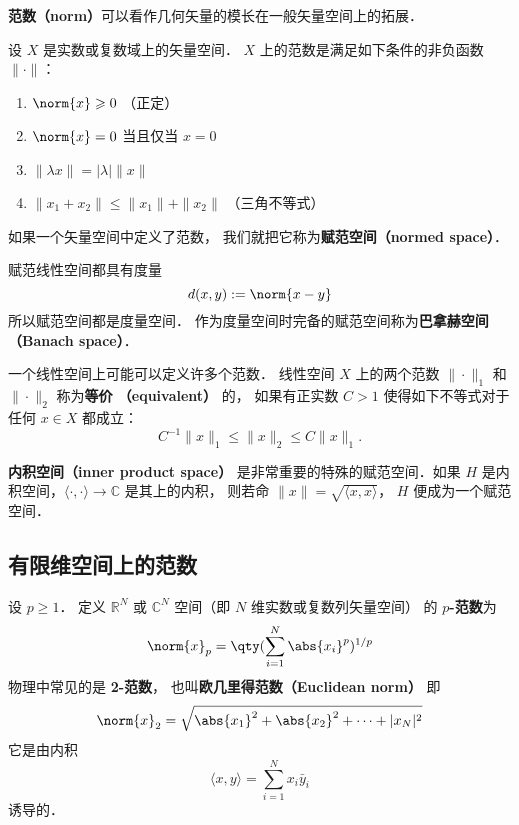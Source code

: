 
\begin{issues}
\end{issues}



\textbf{范数（norm）}可以看作几何矢量的模长在一般矢量空间上的拓展．
\begin{definition}{}\label{NormV_def1}
设 $X$ 是实数或复数域上的矢量空间． $X$ 上的范数是满足如下条件的非负函数 $\|\cdot\|$：
\begin{enumerate}
\item $\norm{x} \geqslant 0$ （正定）
\item $\norm{x} = 0$ 当且仅当 $x = 0$
\item $\|\lambda x\| = |\lambda|\|x\|$
\item $\|x_1+x_2\| \leqslant \|x_1\|+ \|x_2\|$ （三角不等式）
\end{enumerate}
如果一个矢量空间中定义了范数， 我们就把它称为\textbf{赋范空间（normed space）}．
\end{definition}

赋范线性空间都具有度量
\begin{equation}
d(x,y) := \norm{x-y}
\end{equation}
所以赋范空间都是度量空间． 作为度量空间时完备的赋范空间称为\textbf{巴拿赫空间（Banach space）}．

一个线性空间上可能可以定义许多个范数． 线性空间 $X$ 上的两个范数 $\|\cdot\|_1$ 和 $\|\cdot\|_2$ 称为\textbf{等价 （equivalent）} 的， 如果有正实数 $C>1$ 使得如下不等式对于任何 $x\in X$ 都成立：
$$
C^{-1}\|x\|_{1}\leq\|x\|_2\leq C\|x\|_1.
$$

\textbf{内积空间（inner product space）} 是非常重要的特殊的赋范空间．如果 $H$ 是内积空间，$\langle\cdot,\cdot\rangle\to\mathbb C$ 是其上的内积， 则若命 $\|x\|=\sqrt{\langle x,x\rangle }$， $H$ 便成为一个赋范空间．

\subsection{有限维空间上的范数}
设 $p\geq1$． 定义 $\mathbb R^N$ 或 $\mathbb C^N$ 空间（即 $N$ 维实数或复数列矢量空间） 的 \textbf{$p$-范数}为
\begin{equation}
\norm{ x}_p = \qty(\sum_{i=1}^N \abs{x_i}^p)^{1/p}
\end{equation}
物理中常见的是 \textbf{2-范数}， 也叫\textbf{欧几里得范数（Euclidean norm）} 即
\begin{equation}
\norm{ x}_2 = \sqrt{\abs{x_1}^2 + \abs{x_2}^2 + \dots+|x_N|^2}
\end{equation}
它是由内积
$$
\langle x,y\rangle=\sum_{i=1}^Nx_i\bar y_i
$$
诱导的．

